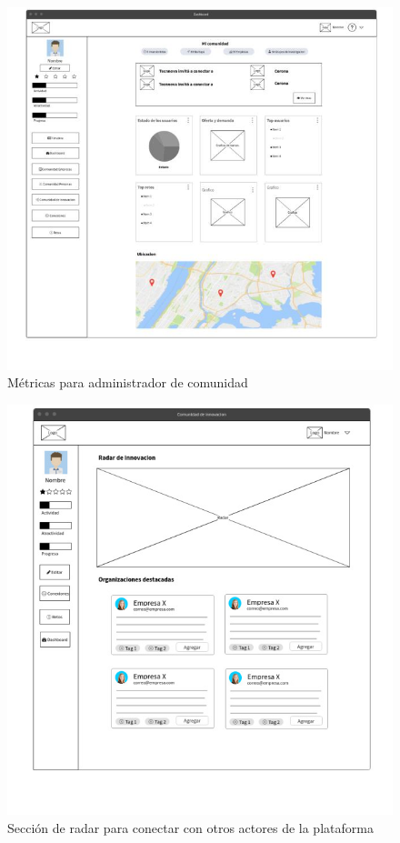\begin{figure}[ht]
	\includegraphics[scale=0.6, center]{images/mockup3.jpg}
	\caption{Métricas para administrador de comunidad}
	\label{fig:img6}
\end{figure}

\begin{figure}[ht]
	\includegraphics[scale=0.6, center]{images/mockup4.jpg}
	\caption{Sección de radar para conectar con otros actores de la plataforma}
	\label{fig:img7}
\end{figure}